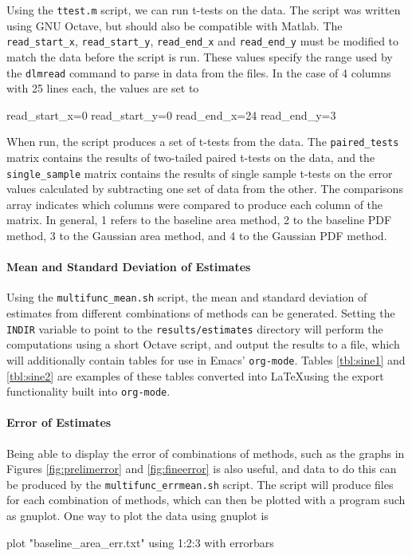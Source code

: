 \documentclass[a4paper,11pt]{article}
\begin{document}
\begin{appendices}
    Using the \texttt{ttest.m} script, we can run t-tests on the data. The script
    was written using GNU Octave, but should also be compatible with
    Matlab. The \texttt{read\_start\_x}, \texttt{read\_start\_y},
    \texttt{read\_end\_x} and \texttt{read\_end\_y} must be modified to match the
    data before the script is run. These values specify the range used by the
    \texttt{dlmread} command to parse in data from the files. In the case of 4
    columns with 25 lines each, the values are set to \small
    \begin{verbatimtab}
    read_start_x=0
    read_start_y=0
    read_end_x=24
    read_end_y=3
    \end{verbatimtab}
    \normalsize
    When run, the script produces a set of t-tests from the data. The
    \texttt{paired\_tests} matrix contains the results of two-tailed paired t-tests
    on the data, and the \texttt{single\_sample} matrix contains the results of
    single sample t-tests on the error values calculated by subtracting one set of
    data from the other. The comparisons array indicates which columns were compared
    to produce each column of the matrix. In general, 1 refers to the baseline area
    method, 2 to the baseline PDF method, 3 to the Gaussian area method, and 4 to
    the Gaussian PDF method.

    \paragraph{Mean and Standard Deviation of Estimates} Using the \texttt{multifunc\_mean.sh} script, the mean
    and standard deviation of estimates from different combinations of methods can
    be generated. Setting the \texttt{INDIR} variable to point to the
    \texttt{results/estimates} directory will perform the computations using a short
    Octave script, and output the results to a file, which will additionally contain
    tables for use in Emacs' \texttt{org-mode}. Tables \ref{tbl:sine1} and
    \ref{tbl:sine2} are examples of these tables converted into \LaTeX using the
    export functionality built into \texttt{org-mode}.

    \paragraph{Error of Estimates}
    Being able to display the error of combinations of methods, such as the graphs
    in Figures \ref{fig:prelimerror} and \ref{fig:fineerror} is also useful, and
    data to do this can be produced by the \texttt{multifunc\_errmean.sh}
    script. The script will produce files for each combination of methods, which can
    then be plotted with a program such as gnuplot. One way to plot the data using
    gnuplot is
    \small
    \begin{verbatimtab}
    plot "baseline_area_err.txt" using 1:2:3 with errorbars
    \end{verbatimtab}
    \normalsize

\end{appendices}
\end{document}
